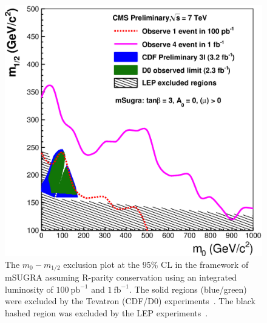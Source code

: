 \label{sec:tables}




\vspace{30 mm}
\begin{figure}[htb]
\begin{center}
\includegraphics[width=0.7\linewidth]{figs/exclusion1fbssa.eps}
\caption{The $m_{0}-m_{1/2}$ exclusion plot at the 95\% CL in the framework of
mSUGRA assuming R-parity conservation using an  integrated  luminosity of
$100~\mathrm{pb}^{-1}$ and $1~\mathrm{fb}^{-1}$. The solid regions (blue/green) were
excluded by the Tevatron (CDF/D0) experiments~\cite{cdf:recentSusy, d0:recentSusy}.
The black hashed region was excluded by the LEP experiments~\cite{lep:lepsusyreach}.
\label{fig:ssadd_exclusion}}

\end{center}
\end{figure}


